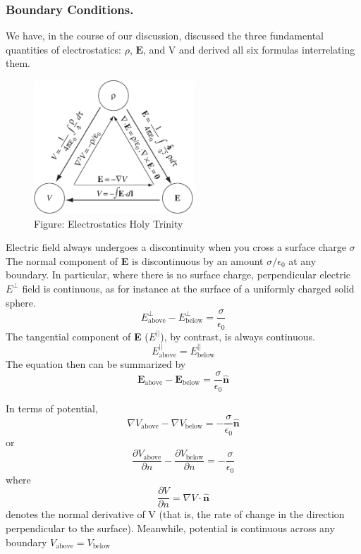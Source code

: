 \documentclass[../../../main.tex]{subfiles}
\begin{document}
\subsubsection*{Boundary Conditions.}
We have, in the course of our discussion, discussed the three
fundamental quantities of electrostatics: $\rho$, $\mathbf{E}$, and V and derived all six formulas interrelating  them. 

\begin{figure}[b]
    \centering
    \includegraphics[height=5cm]{../Rss/Electromagnetism/Electrostatics/ElecstatHolyTrinity.png}
    \caption*{Figure: Electrostatics Holy Trinity}
\end{figure}

Electric field always undergoes a discontinuity
when you cross a surface charge $\sigma$
The normal component of \textbf{E} is discontinuous by an amount $\sigma/\epsilon_0$ at any boundary.
In particular, where there is no surface charge, perpendicular electric $E^\bot$ field is continuous, as for instance at the
surface of a uniformly charged solid sphere.
\begin{equation*}
    E^\bot_{\text{above}}-E^\bot_{\text{below}}=\frac{\sigma}{\epsilon_0}
\end{equation*}
The tangential component of \textbf{E} ($E^{||}$), by contrast, is always continuous.
\begin{equation*}
    E^{||}_{\text{above}}=E^{||}_{\text{below}}
\end{equation*}
The equation then can be summarized by
\begin{equation*}
    \mathbf{E}_{\text{above}}- \mathbf{E}_{\text{below}}=\frac{\sigma}{\epsilon_0}\mathbf{\hat{n}}
\end{equation*}

In terms of potential,
\begin{equation*}
    \nabla V_{\text{above}}-\nabla V_{\text{below}}=-\frac{\sigma}{\epsilon_0}\mathbf{\hat{n}}
\end{equation*}
or
\begin{equation*}
    \frac{\partial V_{\text{above}}}{\partial n}- \frac{\partial V_{\text{below}}}{\partial n}=-\frac{\sigma}{\epsilon_0}
\end{equation*}
where
\begin{equation*}
    \frac{\partial V}{\partial n}=\nabla V\cdot \mathbf{\hat{n}}
\end{equation*}
denotes the normal derivative of V (that is, the rate of change in the direction
perpendicular to the surface). Meanwhile, potential is continuous across any boundary $V_{\text{above}}=V_{\text{below}}$
\end{document}
